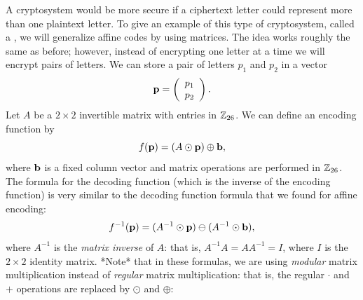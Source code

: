 A cryptosystem would be more secure if a ciphertext letter could
represent more than one plaintext letter.  To give an example of this
type of cryptosystem, called a , we will generalize
affine codes by using matrices. The idea works roughly the same as
before; however, instead of encrypting one letter at a time we will
encrypt pairs of letters.  We can store a pair of letters $p_1$ and
$p_2$ in a vector  
$$
{\bold p} = 
\left(
\begin{array}{c}
p_1 \\ p_2
\end{array}
\right).
$$
Let $A$ be a $2 \times 2$ invertible matrix
with entries in ${\Bbb Z}_{26}$. We can define an encoding function by
$$
f({\bold p}) = (A \odot {\bold p}) \oplus {\bold b} ,
$$
where ${\bold b}$ is a fixed column vector and matrix operations are
performed in ${\Bbb Z}_{26}$. The formula for  the decoding function (which is the inverse of the encoding function) is very similar to the decoding function formula that we found for affine encoding:
$$
f^{-1}({\bold p}) = (A^{-1} \odot {\bold p}) \ominus (A^{-1} \odot {\bold b}),
$$
where $A^{-1}$ is the \emph{matrix inverse} of $A$: that is, $A^{-1}A = A A^{-1} = I$, where $I$ is the $2 \times 2$ identity matrix.  *Note* that in these formulas, we are using \emph{modular} matrix multiplication instead of \emph{regular} matrix multiplication: that is, the  regular $\cdot$ and $+$ operations are replaced by  $\odot$ and $\oplus$:

